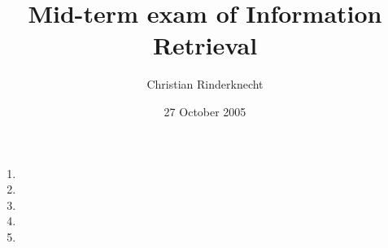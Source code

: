 \documentclass[11pt]{article}
\title{Mid-term exam of Information Retrieval}
\author{Christian Rinderknecht}
\date{27 October 2005}
\begin{document}
\maketitle

\begin{enumerate}

  \item
    

  \item
    

  \item
    

  \item
    

  \item
    

\end{enumerate}
\end{document}
